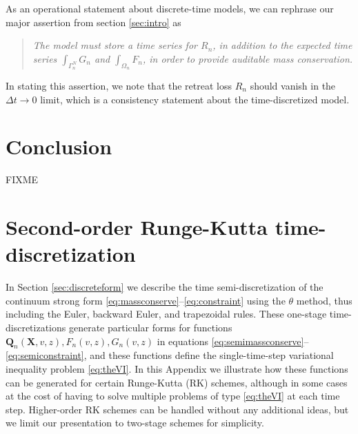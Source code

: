 \documentclass[final,leqno,onefignum,onetabnum]{siamltex1213bueler}
\newcommand\bQ{\mathbf{Q}}
\newcommand\bX{\mathbf{X}}
\begin{document}
As an operational statement about discrete-time models, we can rephrase our major assertion from section \ref{sec:intro} as
\begin{quote}
\emph{The model must store a time series for $R_n$, in addition to the expected time series $\int_{\Gamma_n^N} G_n$ and $\int_{\Omega_n} F_n$, in order to provide auditable mass conservation.}
\end{quote}
In stating this assertion, we note that the retreat loss $R_n$ should vanish in the $\Delta t\to 0$ limit, which is a consistency statement about the time-discretized model.


\section{Conclusion} \label{sec:conclusion}  FIXME






\appendix

\section{Second-order Runge-Kutta time-discretization}   In Section \ref{sec:discreteform} we describe the time semi-discretization of the continuum strong form \eqref{eq:massconserve}--\eqref{eq:constraint} using the $\theta$ method, thus including the Euler, backward Euler, and trapezoidal rules.  These one-stage time-discretizations generate particular forms for functions $\bQ_n(\bX,v,z),F_n(v,z),G_n(v,z)$ in equations \eqref{eq:semimassconserve}--\eqref{eq:semiconstraint}, and these functions define the single-time-step variational inequality problem \eqref{eq:theVI}.  In this Appendix we illustrate how these functions can be generated for certain Runge-Kutta (RK) schemes, although in some cases at the cost of having to solve multiple problems of type \eqref{eq:theVI} at each time step.  Higher-order RK schemes can be handled without any additional ideas, but we limit our presentation to two-stage schemes for simplicity.
\end{document}
